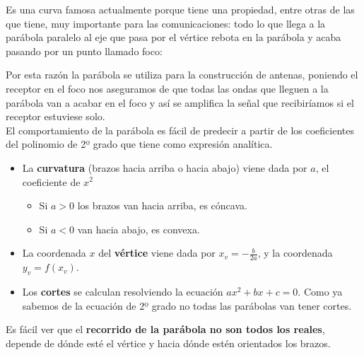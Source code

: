 \documentclass[a4paper,11pt,answers]{exam}
\begin{document}
Es una curva famosa actualmente porque tiene una propiedad, entre otras de las que tiene, muy importante para las comunicaciones: todo lo que llega a la parábola paralelo al eje que pasa por el vértice rebota en la parábola y acaba pasando por un punto llamado foco:
\begin{center}
\end{center}
Por esta razón la parábola se utiliza para la construcción de antenas, poniendo el receptor en el foco nos aseguramos de que todas las ondas que lleguen a la parábola van a acabar en el foco y así se amplifica la señal que recibiríamos si el receptor estuviese solo.\\

El comportamiento de la parábola es fácil de predecir a partir de los coeficientes del polinomio de 2º grado que tiene como expresión analítica.
\begin{itemize}
	\item La \textbf{curvatura} (brazos hacia arriba o hacia abajo) viene dada por $a$, el coeficiente de $x^2$
	\begin{itemize}
		\item Si $a>0$ los brazos van hacia arriba, es cóncava.
		\item Si $a<0$ van hacia abajo, es convexa.
	\end{itemize}
	\item La coordenada $x$ del \textbf{vértice} viene dada por $x_v = -\frac{b}{2a}$, y la coordenada $y_v = f(x_v)$.
	\item Los \textbf{cortes} se calculan resolviendo la ecuación $ax^2 + bx + c = 0$. Como ya sabemos de la ecuación de 2º grado no todas las parábolas van tener cortes.
\end{itemize}
Es fácil ver que el \textbf{recorrido de la parábola no son todos los reales}, depende de dónde esté el vértice y hacia dónde estén orientados los brazos.
\end{document}
